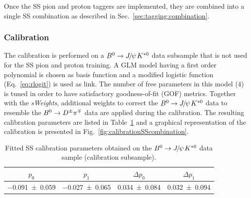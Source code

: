 Once the SS pion and proton taggers are implemented, they are combined into
a single SS combination as described in Sec.~\ref{sec:tagging:combination}.

\subsubsection{Calibration}
\label{sec:tagging:SScalib:combo}

The calibration is performed on a $\Bz\to\jpsi\Kstarz$ data subsample that is not used for the SS pion and proton training.
A GLM model having a first order polynomial is chosen as basis function and a
modified logistic function (Eq.~\ref{eq:rlogit}) is used as link. The number of free parameters in this model (4) is tuned in order to have
satisfactory goodness-of-fit (GOF) metrics. Together with the \emph{sWeights},
additional weights to correct the $\Bz\to\jpsi\Kstarz$ data to resemble the $B^0\rightarrow D^\pm\pi^\mp$ data are applied during the calibration. The
resulting calibration parameters are listed in Table~\ref{tab:calibrationSScombination} and a graphical representation of the calibration 
is presented in Fig.~\ref{fig:calibrationSScombination}.
\begin{table}[tbp]
	\centering
	\caption{Fitted SS calibration parameters obtained on the $\Bz\to\jpsi\Kstarz$ data sample (calibration
	subsample).}
	\begin{tabular}{cccc}
		\toprule
		$p_0$ & $p_1$ & $\Delta p_0$ & $\Delta p_1$ \\
		\midrule
		\num{-0.091\pm0.059}  & \num{-0.027\pm0.065} & \num{0.034\pm0.084} &\num{0.032\pm0.094}\\
		\bottomrule
	\end{tabular}
	\label{tab:calibrationSScombination}
\end{table}
